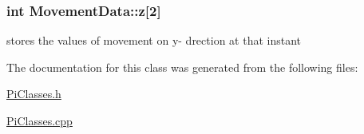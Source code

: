 \subsubsection[{z}]{\setlength{\rightskip}{0pt plus 5cm}int Movement\+Data\+::z\mbox{[}2\mbox{]}\hspace{0.3cm}{\ttfamily [private]}}\label{classMovementData_a319111ec5eb9f0adc4eda7e177e8eccd}
stores the values of movement on y-\/ drection at that instant 

The documentation for this class was generated from the following files\+:\begin{DoxyCompactItemize}
\item 
\hyperlink{PiClasses_8h}{Pi\+Classes.\+h}\item 
\hyperlink{PiClasses_8cpp}{Pi\+Classes.\+cpp}\end{DoxyCompactItemize}
